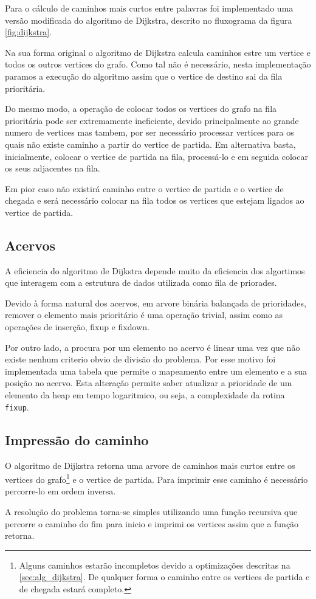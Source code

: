 \documentclass[a4paper, 18pt]{article}
\begin{document}
	\par
	Para o cálculo de caminhos mais curtos entre palavras foi implementado 
uma versão modificada do algoritmo de Dijkstra, descrito no fluxograma da 
figura \ref{fig:dijkstra}.
	\par
	Na sua forma original o algoritmo de Dijkstra calcula caminhos estre um 
vertice e todos os outros vertices do grafo. Como tal não é necessário, nesta 
implementação paramos a execução do algoritmo assim que o vertice de destino 
sai da fila prioritária.
	\par
	Do mesmo modo, a operação de colocar 
todos os vertices do grafo na fila prioritária pode ser extremamente 
ineficiente, devido principalmente ao grande numero de vertices mas tambem, por 
ser necessário processar vertices para os quais não existe caminho a partir do 
vertice de partida. Em alternativa basta, inicialmente, colocar o vertice de 
partida na fila, processá-lo e em seguida colocar os seus adjacentes na fila. 
	\par Em pior caso não existirá caminho entre o vertice de partida e o 
vertice de chegada e será necessário colocar na fila todos os vertices 
que estejam ligados ao vertice de partida.     

\subsection{Acervos}
	\par
	A eficiencia do algoritmo de Dijkstra depende muito da eficiencia dos 
algortimos que interagem com a  estrutura de dados utilizada como fila de 
priorades.
	\par
	Devido à forma natural dos acervos, em arvore binária balançada de 
prioridades, remover o elemento mais prioritário é uma operação trivial, assim 
como as operações de inserção, fixup e fixdown.
	\par Por outro lado, a procura por um elemento no acervo é linear uma vez 
que não existe nenhum criterio obvio de divisão do problema. Por esse motivo 
foi implementada uma tabela que permite o mapeamento entre um elemento e a sua 
posição no acervo.
	Esta alteração permite saber atualizar a prioridade de um elemento da heap 
em tempo logaritmico, ou seja, a complexidade da rotina \texttt{fixup}.
	
\subsection{Impressão do caminho}
	\par
	O algoritmo de Dijkstra retorna uma arvore de caminhos mais curtos entre os 
vertices do grafo\footnote{Alguns caminhos estarão incompletos devido a 
optimizações descritas na \autoref{sec:alg_dijkstra}. De qualquer forma o 
caminho entre os vertices de partida e de chegada estará completo.} e o vertice 
de partida. Para imprimir esse caminho é necessário percorre-lo em ordem 
inversa. 
	\par A resolução do problema torna-se simples utilizando uma função 
recursiva que percorre o caminho do fim para inicio e imprimi os vertices assim 
que a função retorna.
\end{document}
